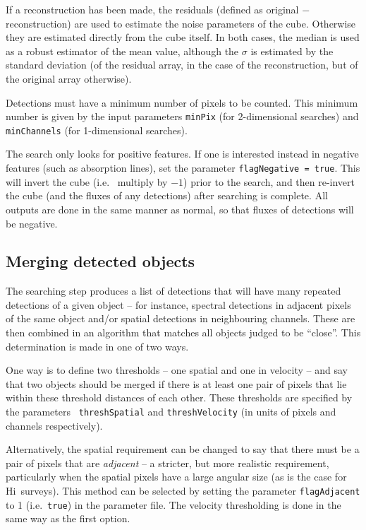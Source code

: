 \documentclass[12pt,a4paper]{article}
\newcommand{\ie}{i.e.\ }
\newcommand{\hi}{H{\sc i}}
\begin{document}
If a reconstruction has been made, the residuals (defined as original
$-$ reconstruction) are used to estimate the noise parameters of the
cube. Otherwise they are estimated directly from the cube itself. In
both cases, the median is used as a robust estimator of the mean
value, although the $\sigma$ is estimated by the standard deviation
(of the residual array, in the case of the reconstruction, but of the
original array otherwise).

Detections must have a minimum number of pixels to be counted. This
minimum number is given by the input parameters {\tt minPix} (for
2-dimensional searches) and {\tt minChannels} (for 1-dimensional
searches).

The search only looks for positive features. If one is interested
instead in negative features (such as absorption lines), set the
parameter {\tt flagNegative = true}. This will invert the cube (\ie
multiply by $-1$) prior to the search, and then re-invert the cube
(and the fluxes of any detections) after searching is complete. All
outputs are done in the same manner as normal, so that fluxes of
detections will be negative.

\subsection{Merging detected objects}
\label{sec-merger}

The searching step produces a list of detections that will have many
repeated detections of a given object -- for instance, spectral
detections in adjacent pixels of the same object and/or spatial
detections in neighbouring channels. These are then combined in an
algorithm that matches all objects judged to be ``close''. This
determination is made in one of two ways.

One way is to define two thresholds -- one spatial and one in velocity
-- and say that two objects should be merged if there is at least one
pair of pixels that lie within these threshold distances of each
other. These thresholds are specified by the parameters {\tt
threshSpatial} and {\tt threshVelocity} (in units of pixels and
channels respectively).

Alternatively, the spatial requirement can be changed to say that
there must be a pair of pixels that are {\it adjacent} -- a stricter,
but more realistic requirement, particularly when the spatial pixels
have a large angular size (as is the case for \hi\ surveys). This
method can be selected by setting the parameter
{\tt flagAdjacent} to 1 (\ie {\tt true}) in the parameter file. The
velocity thresholding is done in the same way as the first option.
\end{document}
